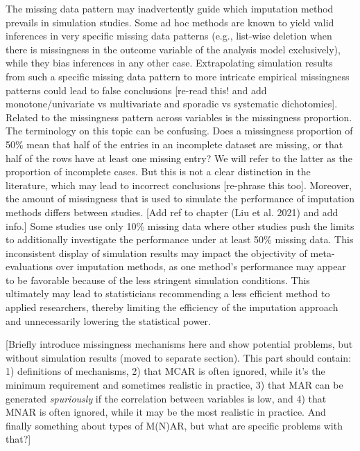 \documentclass[
]{article}
\begin{document}
The missing data pattern may inadvertently guide which imputation method
prevails in simulation studies. Some ad hoc methods are known to yield
valid inferences in very specific missing data patterns (e.g., list-wise
deletion when there is missingness in the outcome variable of the
analysis model exclusively), while they bias inferences in any other
case. Extrapolating simulation results from such a specific missing data
pattern to more intricate empirical missingness patterns could lead to
false conclusions {[}re-read this! and add monotone/univariate vs
multivariate and sporadic vs systematic dichotomies{]}. Related to the
missingness pattern across variables is the missingness proportion. The
terminology on this topic can be confusing. Does a missingness
proportion of 50\% mean that half of the entries in an incomplete
dataset are missing, or that half of the rows have at least one missing
entry? We will refer to the latter as the proportion of incomplete
cases. But this is not a clear distinction in the literature, which may
lead to incorrect conclusions {[}re-phrase this too{]}. Moreover, the
amount of missingness that is used to simulate the performance of
imputation methods differs between studies. {[}Add ref to chapter (Liu
et al. 2021) and add info.{]} Some studies use only 10\% missing data
where other studies push the limits to additionally investigate the
performance under at least 50\% missing data. This inconsistent display
of simulation results may impact the objectivity of meta-evaluations
over imputation methods, as one method's performance may appear to be
favorable because of the less stringent simulation conditions. This
ultimately may lead to statisticians recommending a less efficient
method to applied researchers, thereby limiting the efficiency of the
imputation approach and unnecessarily lowering the statistical power.

{[}Briefly introduce missingness mechanisms here and show potential
problems, but without simulation results (moved to separate section).
This part should contain: 1) definitions of mechanisms, 2) that MCAR is
often ignored, while it's the minimum requirement and sometimes
realistic in practice, 3) that MAR can be generated \emph{spuriously} if
the correlation between variables is low, and 4) that MNAR is often
ignored, while it may be the most realistic in practice. And finally
something about types of M(N)AR, but what are specific problems with
that?{]}

\hypertarget{section}{%
\section{}\label{section}}
\end{document}
